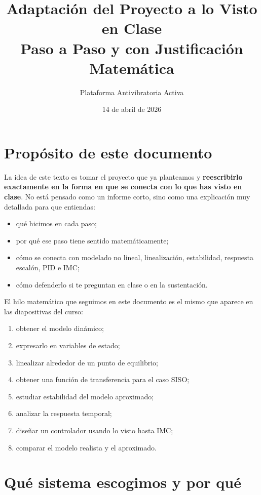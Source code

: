 \documentclass[11pt]{article}
\title{Adaptaci\'on del Proyecto a lo Visto en Clase\\Paso a Paso y con Justificaci\'on Matem\'atica}
\author{Plataforma Antivibratoria Activa}
\date{14 de abril de 2026}
\begin{document}
\maketitle
\tableofcontents
\newpage

\section{Prop\'osito de este documento}

La idea de este texto es tomar el proyecto que ya planteamos y \textbf{reescribirlo exactamente en la forma en que se conecta con lo que has visto en clase}. No est\'a pensado como un informe corto, sino como una explicaci\'on muy detallada para que entiendas:

\begin{itemize}[leftmargin=1.2cm]
\item qu\'e hicimos en cada paso;
\item por qu\'e ese paso tiene sentido matem\'aticamente;
\item c\'omo se conecta con modelado no lineal, linealizaci\'on, estabilidad, respuesta escal\'on, PID e IMC;
\item c\'omo defenderlo si te preguntan en clase o en la sustentaci\'on.
\end{itemize}

El hilo matem\'atico que seguimos en este documento es el mismo que aparece en las diapositivas del curso:

\begin{enumerate}[leftmargin=1.2cm]
\item obtener el modelo din\'amico;
\item expresarlo en variables de estado;
\item linealizar alrededor de un punto de equilibrio;
\item obtener una funci\'on de transferencia para el caso SISO;
\item estudiar estabilidad del modelo aproximado;
\item analizar la respuesta temporal;
\item dise\~nar un controlador usando lo visto hasta IMC;
\item comparar el modelo realista y el aproximado.
\end{enumerate}

\section{Qu\'e sistema escogimos y por qu\'e}
\end{document}
